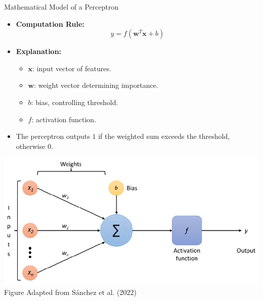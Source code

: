 \documentclass[serif, aspectratio=169]{beamer}
\begin{document}
    \begin{frame}{Mathematical Model of a Perceptron}
        \begin{itemize}\itemsep1em
        \item \textbf{Computation Rule:}
        \[
            y = f(\mathbf{w}^T \mathbf{x} + b)
        \]
        \item \textbf{Explanation:}
        \begin{itemize}
            \item \( \mathbf{x} \): input vector of features.
            \item \( \mathbf{w} \): weight vector determining importance.
            \item \( b \): bias, controlling threshold.
            \item \( f \): activation function.
        \end{itemize}
        \item The perceptron outputs \(1\) if the weighted sum exceeds the threshold, otherwise \(0\).
        \end{itemize}
        \endminipage
        \hfill
        \centering
        \includegraphics[width=\linewidth]{pic/Figure_39.png}\\
        \vspace{0.3em}
        \scriptsize Figure Adapted from Sánchez et al. (2022)
        \endminipage
    \end{frame}
\end{document}
